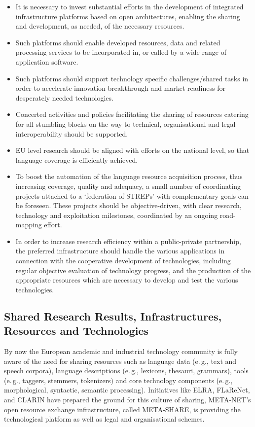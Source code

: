 \documentclass[10pt, plain]{../../metanetpaper}
\begin{document}
\begin{multicols}{2}
\begin{itemize}
\item It is necessary to invest substantial efforts in the development of integrated infrastructure platforms based on open architectures, enabling the sharing and development, as needed, of the necessary resources.
\item Such platforms should enable developed resources, data and related processing services to be incorporated in, or called by a wide range of application software.
\item Such platforms should support technology specific challenges/shared tasks in order to accelerate innovation breakthrough and market-readiness for desperately needed technologies.
\item Concerted activities and policies facilitating the sharing of resources catering for all stumbling blocks on the way to technical, organisational and legal interoperability should be supported.
\item EU level research should be aligned with efforts on the national level, so that language coverage is efficiently achieved.
\item To boost the automation of the language resource acquisition process, thus increasing coverage, quality and adequacy, a small number of coordinating projects attached to a ‘federation of STREPs’ with complementary goals can be foreseen. These projects should be objective-driven, with clear research, technology and exploitation milestones, coordinated by an ongoing road-mapping effort.
\item In order to increase research efficiency within a public-private partnership, the preferred infrastructure should handle the various applications in connection with the cooperative development of technologies, including regular objective evaluation of technology progress, and the production of the appropriate resources which are necessary to develop and test the various technologies.
\end{itemize}

\subsection{Shared Research Results, Infrastructures, Resources and Technologies}
\label{sec:sharing-resources-and-results}


By now the European academic and industrial technology community is fully aware of the need for sharing resources such as language data (e.\,g., text and speech corpora), language descriptions (e.\,g., lexicons, thesauri, grammars), tools (e.\,g., taggers, stemmers, tokenizers) and core technology components (e.\,g., morphological, syntactic, semantic processing). Initiatives like ELRA, FLaReNet, and CLARIN have prepared the ground for this culture of sharing, META-NET's open resource exchange infrastructure, called META-SHARE, is providing the technological platform as well as legal and organisational schemes.


\end{multicols}
\end{document}

